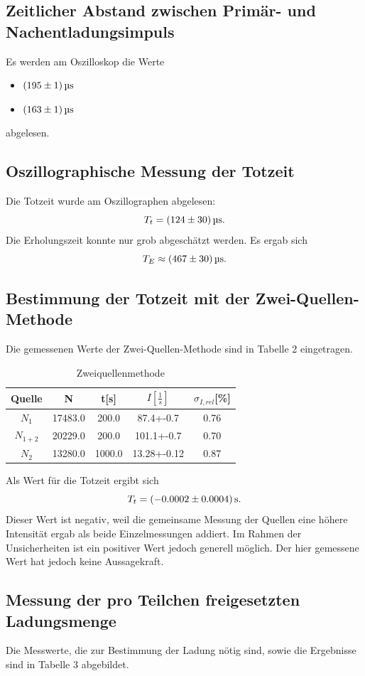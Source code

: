 \documentclass[11pt,ngerman,a4paper]{article}
\begin{document}
\subsection{Zeitlicher Abstand zwischen Primär- und Nachentladungsimpuls}
Es werden am Oszilloskop die Werte
\begin{itemize}
\item $\SI{195+-1}{\micro\second}$
\item $\SI{163+-1}{\micro\second}$
\end{itemize}
abgelesen.
\subsection{Oszillographische Messung der Totzeit}
Die Totzeit wurde am Oszillographen abgelesen:
\[
T_{t} = \SI{124+-30}{\micro\second}.
\]
Die Erholungszeit konnte nur grob abgeschätzt werden. Es ergab sich
\[
T_E \approx \SI{467+-30}{\micro\second}.
\]
\subsection{Bestimmung der Totzeit mit der Zwei-Quellen-Methode}
Die gemessenen Werte der Zwei-Quellen-Methode sind in Tabelle 2 eingetragen.

\begin{table}[H]
\centering
\begin{tabular}{SSSSS}
\toprule
{Quelle} & {N} &{ t[s]} &{ $I\left[\frac{1}{s}\right]$} &{ $\sigma_{I,rel}$[\%] }\\
\midrule
{$N_1$} & 17483.0 & 200.0 & 87.4+-0.7 & 0.76\\
{$N_{1+2}$}& 20229.0 & 200.0 & 101.1+-0.7 & 0.70\\
{$N_2$} & 13280.0 & 1000.0 & 13.28+-0.12 & 0.87\\
\bottomrule
\end{tabular}
\label{blabla2}
\caption{Zweiquellenmethode}
\end{table}

\noindent
Als Wert für die Totzeit ergibt sich
\[
T_{t} = \SI{-0.0002+-0.0004}{\second}.
\]
Dieser Wert ist negativ, weil die gemeinsame Messung der Quellen eine höhere Intensität ergab als beide Einzelmessungen addiert. Im Rahmen der Unsicherheiten ist ein positiver Wert jedoch generell möglich. Der hier gemessene Wert hat jedoch keine Aussagekraft.
\subsection{Messung der pro Teilchen freigesetzten Ladungsmenge}
Die Messwerte, die zur Bestimmung der Ladung nötig sind, sowie die Ergebnisse sind in Tabelle 3 abgebildet.
\end{document}
